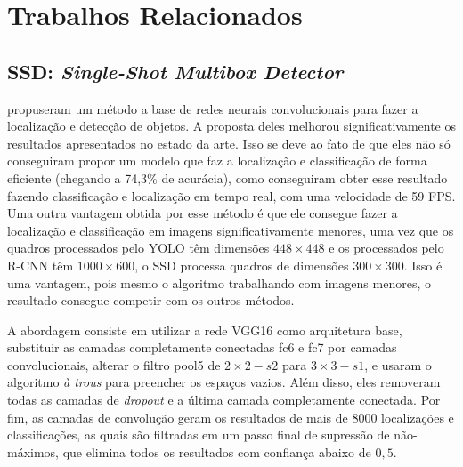 \chapter{Trabalhos Relacionados}
\label{cap:3}
\vspace{-1.9cm}



\section{SSD: \textit{Single-Shot Multibox Detector}}

 propuseram um método a base de redes neurais convolucionais para fazer a localização e detecção de objetos. A proposta deles melhorou significativamente os resultados apresentados no estado da arte. Isso se deve ao fato de que eles não só conseguiram propor um modelo que faz a localização e classificação de forma eficiente (chegando a 74,3\% de acurácia), como conseguiram obter esse resultado fazendo classificação e localização em tempo real, com uma velocidade de 59 \ac{FPS}. Uma outra vantagem obtida por esse método é que ele consegue fazer a localização e classificação em imagens significativamente menores, uma vez que os quadros processados pelo \ac{YOLO} têm dimensões $448 \times 448$ e os processados pelo \ac{R-CNN} têm $1000\times 600$, o \ac{SSD} processa quadros de dimensões $300 \times 300$. Isso é uma vantagem, pois mesmo o algoritmo trabalhando com imagens menores, o resultado consegue competir com os outros métodos.

A abordagem consiste em utilizar a rede VGG16 \cite{simonyan-2014} como arquitetura base, substituir as camadas completamente conectadas fc6 e fc7 por camadas convolucionais, alterar o filtro pool5 de $2 \times 2 - s2$ para $3 \times 3 - s1$, e usaram o algoritmo \textit{à trous}\cite{holschneider-1990} para preencher os espaços vazios. Além disso, eles removeram todas as camadas de \textit{dropout} e a última camada completamente conectada. Por fim, as camadas de convolução geram os resultados de mais de 8000 localizações e classificações, as quais são filtradas em um passo final de supressão de não-máximos, que elimina todos os resultados com confiança abaixo de $0,5$.

